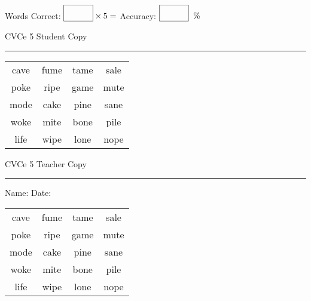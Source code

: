 \documentclass{memoir}
\begin{document}
\small

Words Correct: $\fbox{\phantom{\huge 100}} \times 5 = $ Accuracy: $\fbox{\phantom{\huge 100}}\;\; \%$ 

\vfill

\newpage


\footnotesize \noindent
CVCe 5 \hfill Student Copy
\smallskip
\hrule

\Large

\setlength{\tabcolsep}{14pt}
\def\arraystretch{2}

{\selectfont


\begin{vplace}[0.5]
\begin{center}
\begin{tabular}{cccc}
cave & fume & tame & sale \\
poke & ripe & game & mute \\
mode & cake & pine & sane \\
woke & mite & bone & pile \\
life & wipe & lone & nope \\
\end{tabular}
\end{center}
\end{vplace}

}

\newpage

\footnotesize \noindent
CVCe 5 \hfill Teacher Copy
\smallskip
\hrule

\small

\vfill

\noindent
Name: \underline{\hspace{1.75in}} \hfill Date: \underline{\hspace{1in}}

\Large

{\selectfont


\begin{vplace}[0.5]
\begin{center}
\begin{tabular}{cccc}
cave & fume & tame & sale \\
poke & ripe & game & mute \\
mode & cake & pine & sane \\
woke & mite & bone & pile \\
life & wipe & lone & nope \\
\end{tabular}
\end{center}
\end{vplace}



}
\end{document}
